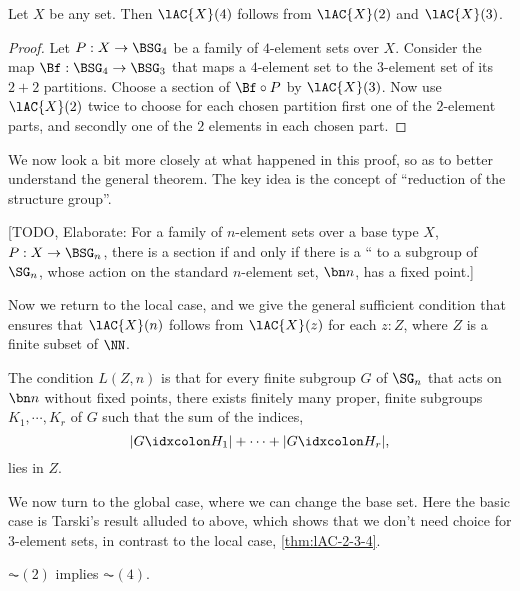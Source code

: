 \begin{theorem}\label{thm:lAC-2-3-4}
  Let $X$ be any set. Then $\lAC{X}(4)$ follows from $\lAC{X}(2)$ and $\lAC{X}(3)$.
\end{theorem}

\begin{proof}
  Let $P : X \to \BSG_4$ be a family of $4$-element sets over $X$.
  Consider the map $\Bf : \BSG_4 \to \BSG_3$ that maps a $4$-element set
  to the $3$-element set of its $2+2$ partitions.
  Choose a section of $\Bf \circ P$ by $\lAC{X}(3)$.
  Now use $\lAC{X}(2)$ twice to choose for each chosen partition
  first one of the $2$-element parts, and secondly one of the $2$
  elements in each chosen part.
\end{proof}

We now look a bit more closely at what happened in this proof,
so as to better understand the general theorem.
The key idea is the concept of ``reduction of the structure group''.

[TODO, Elaborate: For a family of $n$-element sets over a base type $X$, $P : X
\to \BSG_n$, there is a section if and only if there is a
`` to a subgroup of $\SG_n$,
whose action on the standard $n$-element set, $\bn n$, has a fixed point.]

Now we return to the local case, and we give the general
sufficient condition that ensures that $\lAC{X}(n)$ follows from $\lAC{X}(z)$ for each $z:Z$, where $Z$ is a finite subset of $\NN$.

\begin{definition}
  The condition $L(Z,n)$ is that for every finite subgroup $G$ of $\SG_n$
  that acts on $\bn n$ without fixed points,
  there exists finitely many proper, finite subgroups $K_1,\cdots,K_r$ of
  $G$ such that the sum of the indices,
  \[
    |G \idxcolon H_1| + \cdots + |G \idxcolon H_r|,
  \]
  lies in $Z$.
\end{definition}

We now turn to the global case, where we can change the base set.
Here the basic case is Tarski's result alluded to above,
which shows that we don't need choice for $3$-element sets,
in contrast to the local case, \cref{thm:lAC-2-3-4}.

\begin{theorem}
  $\AC(2)$ implies $\AC(4)$.
\end{theorem}

